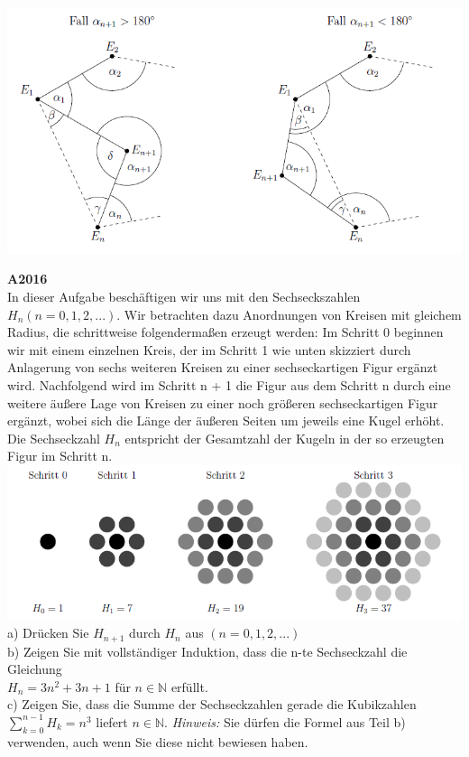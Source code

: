 \documentclass[landscape,twocolumn,a4paper]{article}
\begin{document}
\includegraphics[scale=0.8]{bild2.png} \\
\bigskip

\newpage
\textbf{A2016} \\
In dieser Aufgabe beschäftigen wir uns mit den Sechseckszahlen $H_n (n=0,1,2,...)$. Wir betrachten
dazu Anordnungen von Kreisen mit gleichem Radius, die schrittweise folgendermaßen erzeugt werden:
Im Schritt 0 beginnen wir mit einem einzelnen Kreis, der im Schritt 1 wie unten skizziert durch
Anlagerung von sechs weiteren Kreisen zu einer sechseckartigen Figur ergänzt wird. Nachfolgend
wird im Schritt n + 1 die Figur aus dem Schritt n durch eine weitere äußere Lage von Kreisen zu
einer noch größeren sechseckartigen Figur ergänzt, wobei sich die Länge der äußeren Seiten um jeweils
eine Kugel erhöht. Die Sechseckzahl $H_n$ entspricht der Gesamtzahl der Kugeln in der so erzeugten
Figur im Schritt n. \\

\includegraphics[scale=0.8]{bild1.png} \\

a) Drücken Sie $H_{n+1}$ durch $H_n$ aus $(n=0,1,2,...)$ \\
b) Zeigen Sie mit vollständiger Induktion, dass die n-te Sechseckzahl die Gleichung \\
 $H_n =3n^2 + 3n +1$ für 
$n \in \mathbb{N}$ erfüllt. \\
c) Zeigen Sie, dass die Summe der Sechseckzahlen gerade die Kubikzahlen
 $\sum\limits_{k=0}^{n-1} H_k = n^3$ liefert $n \in \mathbb{N}$. \textit{Hinweis:} Sie dürfen die Formel aus
 Teil b) verwenden, auch wenn Sie diese nicht bewiesen haben.
\bigskip
\end{document}
